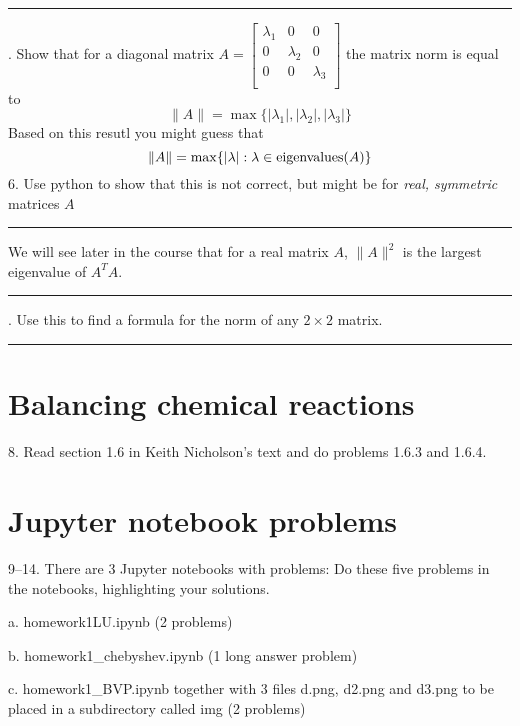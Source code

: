 \bigskip
\hrule
{}. Show that for a diagonal matrix  $A=\begin{bmatrix}\lambda_1&0&0\\0&\lambda_2&0\\0&0&\lambda_3\\\end{bmatrix}$ the matrix norm is equal to
$$
\|A\| = \max\{|\lambda_1|,|\lambda_2|,|\lambda_3|\}
$$
\bigskip
Based on this resutl you might guess that 
$$
\|A\| = \max\{  | \lambda|  :  \lambda \in \hbox{eigenvalues}(A)\}
$$
6.  Use python to show that this is not correct, but might be for {\it real, symmetric} matrices $A$
\bigskip
\hrule
\bigskip
We will see later in the course that for a real matrix $A$, $\|A\|^2$ is the largest eigenvalue of $A^TA$. 
\bigskip
\hrule
{}. Use this to find a formula  for the norm of any $2\times 2$ matrix. 
\bigskip\bigskip
\hrule
\bigskip


\section{Balancing chemical reactions}

8. Read section 1.6 in  Keith Nicholson's text and do problems 1.6.3 and 1.6.4.
\bigskip

\section{Jupyter notebook problems}
9--14. There are 3 Jupyter notebooks with problems: Do these five problems in the notebooks, highlighting your solutions. 
\bigskip

a. homework1LU.ipynb  (2 problems)
\bigskip

b. homework1\_chebyshev.ipynb (1 long answer problem)
\bigskip

c. homework1\_BVP.ipynb together with 3 files d.png, d2.png and d3.png to be placed in a subdirectory called img  (2 problems)



